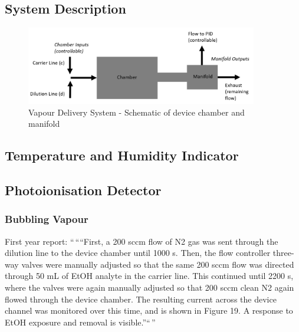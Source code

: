 \documentclass[
  a4paper,
]{scrbook}
\begin{document}
\hypertarget{system-description}{%
\subsection{System Description}\label{system-description}}

\begin{figure}

{\centering \includegraphics[width=0.9\textwidth,height=\textheight]{./figures/ch7/chamber-manifold.png}

}

\caption{Vapour Delivery System - Schematic of device chamber and
manifold}

\end{figure}

\hypertarget{temperature-and-humidity-indicator}{%
\subsection{Temperature and Humidity
Indicator}\label{temperature-and-humidity-indicator}}

\hypertarget{photoionisation-detector}{%
\subsection{Photoionisation Detector}\label{photoionisation-detector}}

\hypertarget{bubbling-vapour}{%
\subsubsection*{Bubbling Vapour}\label{bubbling-vapour}}

First year report: ``\,````First, a 200 sccm flow of N2 gas was sent
through the dilution line to the device chamber until 1000 s. Then, the
flow controller three-way valves were manually adjusted so that the same
200 sccm flow was directed through 50 mL of EtOH analyte in the carrier
line. This continued until 2200 s, where the valves were again manually
adjusted so that 200 sccm clean N2 again flowed through the device
chamber. The resulting current across the device channel was monitored
over this time, and is shown in Figure 19. A response to EtOH exposure
and removal is visible.''``\,''
\end{document}
